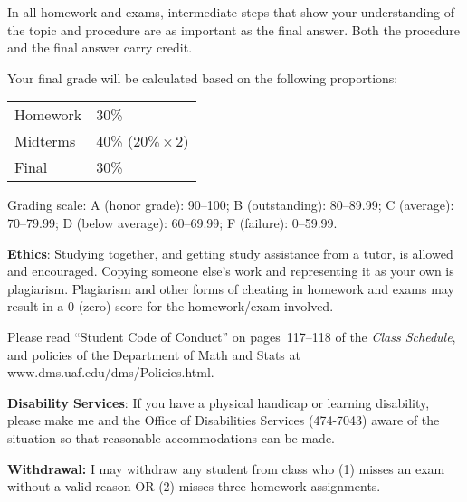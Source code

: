\documentclass{article}
\begin{document}
In all homework and exams,
intermediate steps that show your understanding
of the topic and procedure are as important as the final answer.
Both the procedure and the final answer carry credit.

Your final grade will be calculated based on the following proportions:

\hskip2cm
\begin{tabular}{ll}
Homework & 30\%\\
Midterms & 40\% ($20\% \times 2$)\\
Final & 30\%
\end{tabular}

Grading scale:
A (honor grade): 90--100;
B (outstanding): 80--89.99;
C (average): 70--79.99;
D (below average): 60--69.99;
F (failure): 0--59.99.

\bigskip
\textbf{\large Ethics}:
Studying together, and getting study assistance from a tutor, is allowed
and encouraged. Copying someone else's work and representing it as your
own is plagiarism. Plagiarism and other forms of cheating in homework
and exams may result in a 0 (zero) score for the homework/exam
involved.

Please read ``Student Code of Conduct'' on pages~117--118 of the
\emph{Class Schedule}, and policies of the Department of Math and Stats
at www.dms.uaf.edu/dms/Policies.html.


\bigskip
\textbf{\large Disability Services}:
If you have a physical handicap or learning disability, please make me
and the Office of Disabilities Services (474-7043) aware of the
situation so that reasonable accommodations can be made.


\bigskip
\textbf{\large Withdrawal:}
I may withdraw any student from class who
(1) misses an exam without a valid reason OR
(2) misses three homework assignments.
\end{document}
